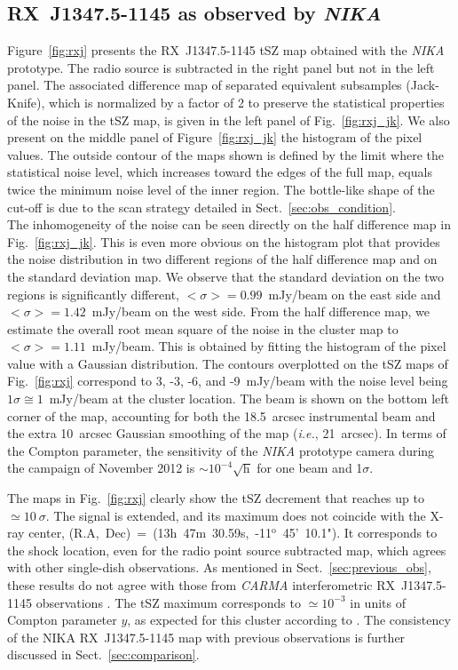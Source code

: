 \subsection{\mbox{RX~J1347.5-1145} as observed by {\it NIKA}}
\label{sec:result_map}
Figure~\ref{fig:rxj} presents the \mbox{RX~J1347.5-1145} tSZ map obtained with the {\it NIKA} prototype. The radio source is subtracted in the right panel but not in the left panel. The associated difference map of separated equivalent subsamples (Jack-Knife), which is normalized by a factor of 2 to preserve the statistical properties of the noise in the tSZ map, is given in the left panel of Fig.~\ref{fig:rxj_jk}. We also present on the middle panel of Figure~\ref{fig:rxj_jk} the histogram of the pixel values. The outside contour of the maps shown is defined by the limit where the statistical noise level, which increases toward the edges of the full map, equals twice the minimum noise level of the inner region. The bottle-like shape of the cut-off is due to the scan strategy detailed in Sect.~\ref{sec:obs_condition}. \\

The inhomogeneity of the noise can be seen directly on the half difference map in Fig.~\ref{fig:rxj_jk}. This is even more obvious on the histogram plot that provides the noise distribution in two different regions of the half difference map and on the standard deviation map. We observe that the standard deviation on the two regions is significantly different,  $<\sigma> = 0.99$~mJy/beam on the east side and $<\sigma> = 1.42$~mJy/beam on the west side. From the half difference map, we estimate the overall root mean square of the noise in the cluster map to $<\sigma> = 1.11$~mJy/beam. This is obtained by fitting the histogram of the pixel value with a Gaussian distribution. The contours overplotted on the tSZ maps of Fig.~\ref{fig:rxj} correspond to 3, -3, -6, and -9~mJy/beam with the noise level being $1 \sigma \cong 1$~mJy/beam at the cluster location. The beam is shown on the bottom left corner of the map, accounting for both the 18.5~arcsec instrumental beam and the extra 10~arcsec Gaussian smoothing of the map ({\it i.e.}, 21~arcsec). In terms of the Compton parameter, the sensitivity of the {\it NIKA} prototype camera during the campaign of November 2012 is $\sim 10^{-4} \sqrt{\mathrm{h}}$ for one beam and 1$\sigma$.
	
The maps in Fig.~\ref{fig:rxj} clearly show the tSZ decrement that reaches up to $\simeq 10 \ \sigma$. The signal is extended, and its maximum does not coincide with the \mbox{X-ray} center, (R.A,~Dec)~=~(13h~47m~30.59s,~-11$^{\mathrm{o}}$~45'~10.1"). It corresponds to the shock location, even for the radio point source subtracted map, which agrees with other single-dish observations.  As mentioned in Sect.~\ref{sec:previous_obs}, these results do not agree with those from {\it CARMA} interferometric \mbox{RX~J1347.5-1145}  observations \citep{plagge_2012}. The tSZ maximum corresponds to $\simeq 10^{-3}$ in units of Compton parameter $y$, as expected for this cluster according to \cite{pointecouteau_1999}. The consistency of the NIKA  \mbox{RX~J1347.5-1145} map with previous observations is further discussed in Sect.~\ref{sec:comparison}.
	 
